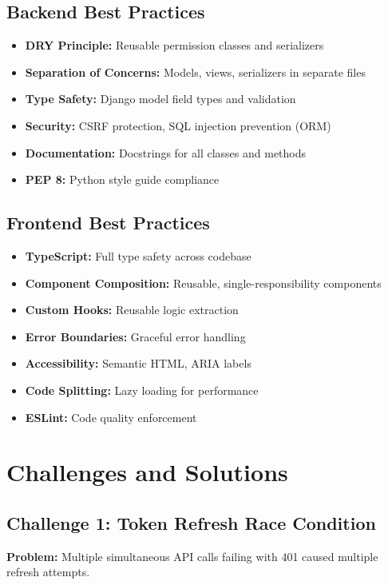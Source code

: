 \documentclass[11pt,a4paper]{article}
\begin{document}
\subsection{Backend Best Practices}
\begin{itemize}[leftmargin=*]
    \item \textbf{DRY Principle:} Reusable permission classes and serializers
    \item \textbf{Separation of Concerns:} Models, views, serializers in separate files
    \item \textbf{Type Safety:} Django model field types and validation
    \item \textbf{Security:} CSRF protection, SQL injection prevention (ORM)
    \item \textbf{Documentation:} Docstrings for all classes and methods
    \item \textbf{PEP 8:} Python style guide compliance
\end{itemize}

\subsection{Frontend Best Practices}
\begin{itemize}[leftmargin=*]
    \item \textbf{TypeScript:} Full type safety across codebase
    \item \textbf{Component Composition:} Reusable, single-responsibility components
    \item \textbf{Custom Hooks:} Reusable logic extraction
    \item \textbf{Error Boundaries:} Graceful error handling
    \item \textbf{Accessibility:} Semantic HTML, ARIA labels
    \item \textbf{Code Splitting:} Lazy loading for performance
    \item \textbf{ESLint:} Code quality enforcement
\end{itemize}

\section{Challenges and Solutions}

\subsection{Challenge 1: Token Refresh Race Condition}
\textbf{Problem:} Multiple simultaneous API calls failing with 401 caused multiple refresh attempts.
\end{document}
